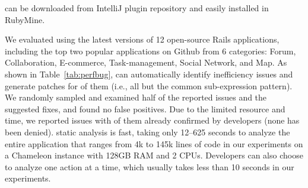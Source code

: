 
\label{sec:evaluation}


\Tool can be downloaded from IntelliJ plugin repository \cite{downloadPW} %
and easily installed in RubyMine. 

We evaluated \Tool using the latest versions of 12 open-source 
Rails applications, including the top two popular applications on Github from 6 categories: Forum, Collaboration, E-commerce, Task-management, Social Network, and Map.
As shown in Table~\ref{tab:perfbug}, \Tool can automatically identify \issueNum inefficiency issues and generate patches for \fixedIssueNum of them (i.e., all but the common sub-expression pattern). We randomly 
sampled and examined half of the reported issues and the suggested fixes,
and found no false positives. %
Due to the limited resource and time, we reported 
\reportedIssue issues with \confirmedIssue of them already confirmed by developers (none
has been denied). 
\Tool static analysis is fast, taking only 12--625 seconds to analyze the entire application
that ranges from 4k to 145k lines of code in our experiments on a Chameleon instance with 128GB RAM and 2 CPUs. 
Developers can also choose to analyze one action at a time, which usually takes less than 10 seconds 
in our experiments.

